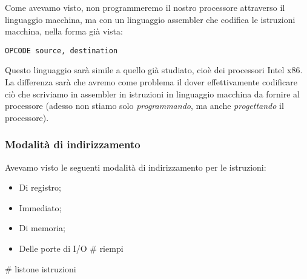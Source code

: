 \documentclass[a4paper,11pt]{article}
\begin{document}
Come avevamo visto, non programmeremo il nostro processore attraverso il linguaggio macchina, ma con un linguaggio assembler che codifica le istruzioni macchina, nella forma già vista:
\begin{lstlisting}	
OPCODE source, destination
\end{lstlisting}

Questo linguaggio sarà simile a quello già studiato, cioè dei processori Intel x86.
La differenza sarà che avremo come problema il dover effettivamente codificare ciò che scriviamo in assembler in istruzioni in linguaggio macchina da fornire al processore (adesso non stiamo solo \textit{programmando}, ma anche \textit{progettando} il processore).

\subsubsection{Modalità di indirizzamento}
Avevamo visto le seguenti modalità di indirizzamento per le istruzioni:
\begin{itemize}
	\item Di registro;
	\item Immediato;
	\item Di memoria;
	\item Delle porte di I/O # riempi
\end{itemize}

# listone istruzioni
\end{document}
